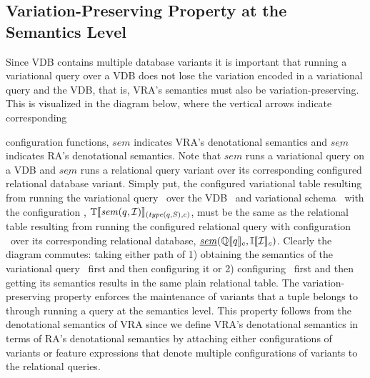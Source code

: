 \subsection{Variation-Preserving Property at the Semantics Level}
\label{sec:var-pres-sem}

Since VDB contains multiple database variants
it is important that running a variational query over a  VDB  does not lose the variation 
encoded in a variational query and the VDB, that is, VRA's semantics
must also be variation-preserving. This is visualized in the diagram below,
where the vertical arrows indicate corresponding
%
\begin{wrapfigure}{r}{0.24\textwidth}
\begin{center}
\end{center}
\end{wrapfigure}
%
 configuration functions,
$\mathit{sem}$ indicates VRA's denotational semantics and 
$\underline{\mathit{sem}}$ indicates RA's denotational semantics. 
Note that $\mathit{sem}$ runs a variational query on a VDB and 
$\underline{\mathit{sem}}$ runs a relational query variant over its corresponding
configured relational database variant. 
%
Simply put, the configured variational table
resulting from running the variational query \vQ\ over the
VDB \vdbInst\ and variational schema \vSch\ with the configuration \config,  
$\otSem {\mathit{type} (\vQ, \vSch)} {\mathit{sem} (\vQ, \vdbInst)}$, 
must be the same as the relational table resulting from running the configured
relational query with configuration \config\ over its corresponding relational 
database, $\mathit{\underline{sem}} (\eeSem \vQ, \odbSem \vdbInst)$.
%
Clearly the diagram commutes: taking either path of 1) obtaining the 
semantics of the variational query \constrain \vQ\ first and then configuring it 
or 2)  configuring \constrain \vQ\ first and then getting its semantics
results in the same plain relational table. 
%
The variation-preserving property enforces the maintenance of variants that a 
tuple belongs to through running a query at the semantics level. 
%
This property follows from the denotational semantics of VRA since
we define VRA's denotational semantics in terms of RA's denotational semantics
by attaching either configurations of variants or feature expressions that denote
multiple configurations of variants to the relational queries. 

